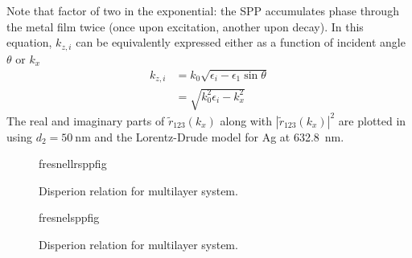 Note that factor of two in the exponential: the SPP accumulates phase
through the metal film twice (once upon excitation, another upon decay).
In this equation, $k_{z,i}$ can be equivalently expressed either as a
function of incident angle $\theta$ or $k_x$
\begin{align}
k_{z,i} &= k_0 \sqrt{\epsilon_i - \epsilon_1 \sin \theta}\\
&= \sqrt{k_0^2\epsilon_i - k_x^2}
\end{align}
The real and imaginary parts of $\tilde{r}_{123}(k_x)$ along with
$|\tilde{r}_{123}(k_x)|^2$ are plotted in  using
$d_2=\SI{50}{\nano\meter}$ and the Lorentz-Drude model for Ag at
\SI{632.8}{\nano\meter}.  
\begin{figure}[ht]
 \centering
{fresnellrsppfig}
\label{fig:fresnellrsppfig}
\caption{Disperion relation for multilayer system.}
\end{figure}

\begin{figure}[ht]
 \centering
{fresnelsppfig}
\label{fig:fresnellrsppfig}
\caption{Disperion relation for multilayer system.}
\end{figure}
